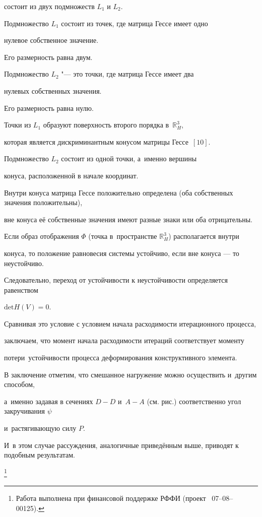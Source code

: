 состоит из двух подмножеств $L_1$ и $L_2$.

Подмножество $L_1$ состоит из точек, где матрица Гессе имеет одно

нулевое собственное значение.

Его размерность равна двум.

Подмножество $L_2$ "--- это точки, где матрица Гессе имеет два

нулевых собственных значения.

Его размерность равна нулю.

Точки из $L_1$ образуют поверхность второго порядка в~$\mathbb{R}^{3}_{H}$,

которая является дискриминантным конусом матрицы Гессе~$[10]$.

Подмножество $L_2$ состоит из одной точки, а~именно вершины

конуса, расположенной в начале координат.

Внутри конуса матрица Гессе положительно определена (оба собственных значения положительны),

вне конуса её собственные значения имеют разные знаки или оба отрицательны.

Если образ отображения $\Phi$ (точка в~пространстве $\mathbb{R}^3_{H}$) располагается внутри

конуса, то положение равновесия системы устойчиво, если вне конуса --- то неустойчиво.

Следовательно, переход от устойчивости к неустойчивости определяется равенством

$\text{det} H(V)=0$.

Сравнивая это условие с условием начала расходимости итерационного процесса,

заключаем, что момент начала расходимости итераций соответствует моменту

потери~устойчивости процесса деформирования конструктивного элемента.



В заключение отметим, что смешанное нагружение можно осуществить и~другим способом,

а~именно задавая в сечениях $D{-}D$ и~$A{-}A$ (см. рис.) соответственно угол закручивания $\psi$

и~растягивающую силу $P$.

И~в этом случае рассуждения, аналогичные приведённым выше, приводят к подобным результатам.



\thanks{Работа выполнена при финансовой поддержке РФФИ {\rm (}проект \No~07--08--00125{\rm).}}


